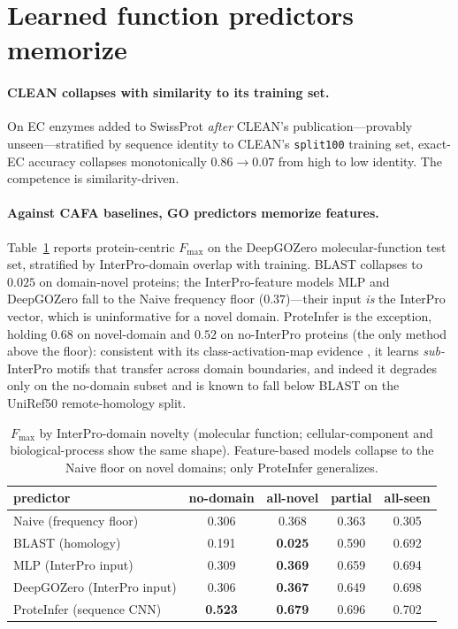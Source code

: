 \documentclass[11pt]{article}
\newcommand{\Fmax}{F_{\max}}
\begin{document}
\section{Learned function predictors memorize}\label{sec:memorize}
\paragraph{CLEAN collapses with similarity to its training set.}
On EC enzymes added to SwissProt \emph{after} CLEAN's publication---provably unseen---stratified
by sequence identity to CLEAN's \texttt{split100} training set, exact-EC accuracy collapses
monotonically $0.86\!\to\!0.07$ from high to low identity. The competence is similarity-driven.

\paragraph{Against CAFA baselines, GO predictors memorize features.}
Table~\ref{tab:domain} reports protein-centric $\Fmax$ on the DeepGOZero molecular-function test
set, stratified by InterPro-domain overlap with training. BLAST collapses to $0.025$ on
domain-novel proteins; the InterPro-feature models MLP and DeepGOZero fall to the Naive frequency
floor ($0.37$)---their input \emph{is} the InterPro vector, which is uninformative for a novel
domain. ProteInfer is the exception, holding $0.68$ on novel-domain and $0.52$ on no-InterPro
proteins (the only method above the floor): consistent with its class-activation-map evidence
\citep{sanderson2023proteinfer}, it learns \emph{sub-}InterPro motifs that transfer across domain
boundaries, and indeed it degrades only on the no-domain subset and is known to fall below BLAST
on the UniRef50 remote-homology split.

\begin{table}[t]\centering
\caption{$\Fmax$ by InterPro-domain novelty (molecular function; cellular-component and
biological-process show the same shape). Feature-based models collapse to the Naive floor on
novel domains; only ProteInfer generalizes.}\label{tab:domain}
\small
\begin{tabular}{lcccc}
\toprule
predictor & no-domain & all-novel & partial & all-seen\\
\midrule
Naive (frequency floor) & 0.306 & 0.368 & 0.363 & 0.305\\
BLAST (homology) & 0.191 & \textbf{0.025} & 0.590 & 0.692\\
MLP (InterPro input) & 0.309 & \textbf{0.369} & 0.659 & 0.694\\
DeepGOZero (InterPro input) & 0.306 & \textbf{0.367} & 0.649 & 0.698\\
ProteInfer (sequence CNN) & \textbf{0.523} & \textbf{0.679} & 0.696 & 0.702\\
\bottomrule
\end{tabular}
\end{table}
\end{document}
